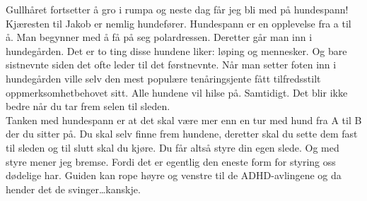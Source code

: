 Gullhåret fortsetter å gro i rumpa og neste dag får jeg bli med på
hundespann! Kjæresten til Jakob er nemlig hundefører. Hundespann er en opplevelse fra a til å. Man begynner med å få på seg
polardressen. Deretter går man inn i hundegården. Det er to ting disse hundene liker:
løping
og mennesker. Og bare sistnevnte siden det ofte leder til det
førstnevnte. Når man setter foten inn i hundegården ville selv den
mest populære tenåringsjente fått
tilfredsstilt oppmerksomhetbehovet sitt. Alle hundene vil hilse på.
Samtidigt. Det blir ikke bedre når du tar frem selen til sleden.\\

Tanken med hundespann  er at det skal være mer enn en tur
med hund fra A til B der du sitter på. Du skal selv finne frem hundene, deretter
skal du sette dem fast til sleden og til slutt skal du kjøre. Du får
altså styre din egen slede. Og med styre mener jeg bremse. Fordi det
er egentlig den eneste form for styring oss dødelige har.
Guiden kan rope høyre og venstre til de ADHD-avlingene og da hender det
de svinger\ldots kanskje.

